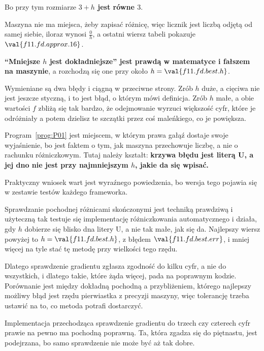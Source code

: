 \begin{fr}
\begin{ansblock}
Bo przy tym rozmiarze \textbf{$3 + h$ jest równe $3$}.
\end{ansblock}

Maszyna nie ma miejsca, żeby zapisać różnicę, więc licznik jest liczbą odjętą
od samej siebie, iloraz wynosi $\frac{0}{h}$, a ostatni wiersz tabeli pokazuje
$\val{f11.fd.approx.16}$.

\begin{trapbox}
\textbf{\enquote{Mniejsze $h$ jest dokładniejsze} jest prawdą w matematyce i
fałszem na maszynie}, a rozchodzą się one przy około
$h = \val{f11.fd.best.h}$.

Wymieniane są dwa błędy i ciągną w przeciwne strony. Zrób $h$ duże, a cięciwa
nie jest jeszcze styczną, i to jest błąd, o którym mówi definicja. Zrób $h$
małe, a obie wartości $f$ zbliżą się tak bardzo, że odejmowanie wyrzuci
większość cyfr, które je odróżniały \dash{} a potem dzielisz te szczątki przez
coś maleńkiego, co je powiększa.

Program~\ref{prog:P01} jest miejscem, w którym prawa gałąź dostaje swoje
wyjaśnienie, bo jest faktem o tym, jak maszyna przechowuje liczbę, a nie o
rachunku różniczkowym. Tutaj należy kształt: \textbf{krzywa błędu jest
literą U, a jej dno nie jest przy najmniejszym $h$, jakie da się wpisać.}
\end{trapbox}

\end{fr}

\begin{fr}
Praktyczny wniosek wart jest wyraźnego powiedzenia, bo wersja tego pojawia się
w zestawie testów każdego frameworka.

Sprawdzanie pochodnej różnicami skończonymi jest techniką prawdziwą i
użyteczną \dash{} tak testuje się implementację różniczkowania automatycznego
\dash{} i działa, gdy $h$ dobierze się blisko dna litery U, a nie tak małe,
jak się da. Najlepszy wiersz powyżej to $h = \val{f11.fd.best.h}$, z błędem
$\val{f11.fd.best.err}$, i mniej więcej na tyle stać tę metodę przy wielkości
tego rzędu.

\begin{aibox}
Dlatego sprawdzenie gradientu zgłasza zgodność do kilku cyfr, a nie do
wszystkich, i dlatego takie, które żąda więcej, pada na poprawnym kodzie.
Porównanie jest między dokładną pochodną a przybliżeniem, którego najlepszy
możliwy błąd jest rzędu pierwiastka z precyzji maszyny, więc tolerancję trzeba
ustawić na to, co metoda potrafi dostarczyć.

Implementacja przechodząca sprawdzenie gradientu do trzech czy czterech cyfr
prawie na pewno ma pochodną poprawną. Ta, która zgadza się do piętnastu, jest
podejrzana, bo samo sprawdzenie nie może być aż tak dobre.
\end{aibox}
\end{fr}

